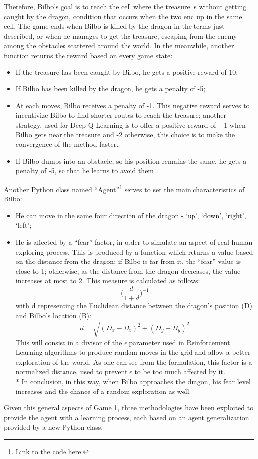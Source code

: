 Therefore, Bilbo's goal is to reach the cell where the treasure is without getting caught by the dragon, condition that occurs when the two end up in the same cell. The game ends when Bilbo is killed by the dragon in the terms just described, or when he manages to get the treasure, escaping from the enemy among the obstacles scattered around the world. In the meanwhile, another function returns the reward based on every game state:
\begin{itemize}[noitemsep, topsep=0ex]
  \item If the treasure has been caught by Bilbo, he gets a positive reward of 10;
  \item If Bilbo has been killed by the dragon, he gets a penalty of -5;
  \item At each moves, Bilbo receives a penalty of -1. This negative reward serves to incentivize Bilbo to find shorter routes to reach the treasure; another strategy, used for Deep Q-Learning is to offer a positive reward of +1 when Bilbo gets near the treasure and -2 otherwise, this choice is to make the convergence of the method faster.
  \item If Bilbo dumps into an obstacle, so his position remains the same, he gets a penalty of -5, so that he learns to avoid them \cite{4}.
\end{itemize}
Another Python class named ``Agent''\footnote{\href{https://github.com/moiraghif/DragonHunting/blob/master/Bilbo\%20World/agents.py}{Link to the code here.}} serves to set the main characteristics of Bilbo:
\begin{itemize}[noitemsep, topsep=0ex]
  \item He can move in the same four direction of the dragon - `up', `down', `right', `left';
  \item He is affected by a ``fear'' factor, in order to simulate an aspect of real human exploring process. This is produced by a function which returns a value based on the distance from the dragon: if Bilbo is far from it, the ``fear'' value is close to 1; otherwise, as the distance from the dragon decreases, the value increases at most to 2. This measure is calculated as follows: 
  $$\Big(\frac{d}{1+d}\Big)^{-1}$$
  with d representing the Euclidean distance between the dragon's position (D) and Bilbo's location (B):
  $$d=\sqrt{(D_{x}-B_{x})^2+(D_{y}-B_{y})^2}$$
  This will consist in a divisor of the $\epsilon$ parameter used in Reinforcement Learning algorithms to produce random moves in the grid and allow a better exploration of the world. As one can see from the formulation, this factor is a normalized distance, used to prevent $\epsilon$ to be too much affected by it.\\*
  In conclusion, in this way, when Bilbo approaches the dragon, his fear level increases and the chance of a random exploration as well.
\end{itemize}
Given this general aspects of Game 1, three methodologies have been exploited to provide the agent with a learning process, each based on an agent generalization provided by a new Python class.

